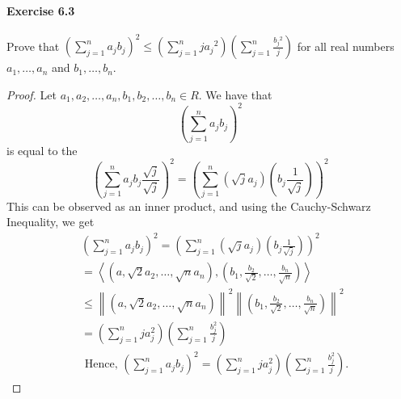 \documentclass{article}
\theoremstyle{definition}
\begin{document}
\paragraph{Exercise 6.3} Prove that $\left(\sum_{j=1}^{n} a_{j} b_{j}\right)^{2} \leq\left(\sum_{j=1}^{n} j a_{j}{ }^{2}\right)\left(\sum_{j=1}^{n} \frac{b_{j}{ }^{2}}{j}\right)$ for all real numbers $a_{1}, \ldots, a_{n}$ and $b_{1}, \ldots, b_{n}$.
\begin{proof}
    Let $a_1, a_2, \ldots, a_n, b_1, b_2, \ldots, b_n \in R$.
We have that
$$
\left(\sum_{j=1}^n a_j b_j\right)^2
$$
is equal to the
$$
\left(\sum_{j=1}^n a_j b_j \frac{\sqrt{j}}{\sqrt{j}}\right)^2=\left(\sum_{j=1}^n\left(\sqrt{j} a_j\right)\left(b_j \frac{1}{\sqrt{j}}\right)\right)^2
$$
This can be observed as an inner product, and using the Cauchy-Schwarz Inequality, we get
$$
\begin{aligned}
&\left(\sum_{j=1}^n a_j b_j\right)^2=\left(\sum_{j=1}^n\left(\sqrt{j} a_j\right)\left(b_j \frac{1}{\sqrt{j}}\right)\right)^2 \\
&=\left\langle\left(a, \sqrt{2} a_2, \ldots, \sqrt{n} a_n\right),\left(b_1, \frac{b_2}{\sqrt{2}}, \ldots, \frac{b_n}{\sqrt{n}}\right)\right\rangle \\
& \leq\left\|\left(a, \sqrt{2} a_2, \ldots, \sqrt{n} a_n\right)\right\|^2\left\|\left(b_1, \frac{b_2}{\sqrt{2}}, \ldots, \frac{b_n}{\sqrt{n}}\right)\right\|^2 \\
&=\left(\sum_{j=1}^n j a_j^2\right)\left(\sum_{j=1}^n \frac{b_j^2}{j}\right) \\
& \text { Hence, }\left(\sum_{j=1}^n a_j b_j\right)^2=\left(\sum_{j=1}^n j a_j^2\right)\left(\sum_{j=1}^n \frac{b_j^2}{j}\right) .
\end{aligned}
$$
\end{proof}
\end{document}
